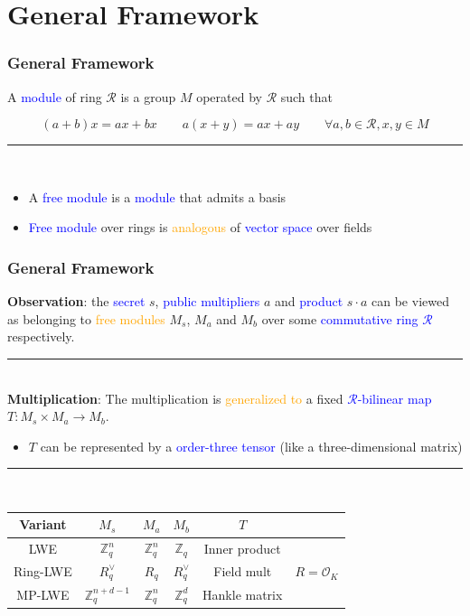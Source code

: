 \documentclass{beamer}
\newcommand{\blue}[1]{\textcolor{blue}{#1}}
\newcommand{\dgreen}[1]{\textcolor{dgreen}{#1}}
\newcommand{\orange}[1]{\textcolor{orange}{#1}}
\newcommand{\cO}{\mathcal{O}}
\newcommand{\cR}{\mathcal{R}}
\newcommand{\bbZ}{\mathbb{Z}}
\newcommand{\divline}{\noindent\rule{6cm}{0.4pt}}
\begin{document}
\section{General Framework}
\frame
{
  \frametitle{General Framework}

  A \blue{module} of ring $\cR$ is a group $M$ operated by $\cR$ such that

  \[(a+b)x=ax+bx\qquad a(x+y)=ax+ay\qquad\forall a,b\in\cR,x,y\in M\]
  \divline\\

  \begin{itemize}
  	\item A \blue{free module} is a \blue{module} that admits a \dgreen{basis}
  	\item \blue{Free module} over rings is \orange{analogous} of \blue{vector space} over fields
  \end{itemize}
}

\frame
{
  \frametitle{General Framework}
  \textbf{Observation}: the \blue{secret} $s$, \blue{public multipliers} $a$ and \blue{product} $s\cdot a$ can be viewed as belonging to \orange{free modules} $M_s$, $M_a$ and $M_b$ over some \blue{commutative ring $\cR$} respectively.

  \divline\\

  \textbf{Multiplication}: The multiplication is \orange{generalized to} a fixed \blue{$\cR$-bilinear map} $T:M_s\times M_a\to M_b$.
  \begin{itemize}
  	\item $T$ can be represented by a \blue{order-three tensor} (like a three-dimensional matrix)
  \end{itemize}

  \divline\\

  \begin{table}[tb]
  	\centering

  	\begin{tabular}{c|ccccc}
  	\hline

  	\hline
  	\textbf{Variant} & $M_s$            & $M_a$      & $M_b$        & $T$           & \\
  	\hline
  		LWE            & $\bbZ_q^n$       & $\bbZ_q^n$ & $\bbZ_q$     & Inner product & \\
  		Ring-LWE       & $R_q^{\vee}$     & $R_q$      & $R_q^{\vee}$ & Field mult    & $R=\cO_K$ \\
  		MP-LWE         & $\bbZ_q^{n+d-1}$ & $\bbZ_q^n$ & $\bbZ_q^d$   & Hankle matrix & \\
  	\hline

  	\hline
  	\end{tabular}
  \end{table}
}
\end{document}
